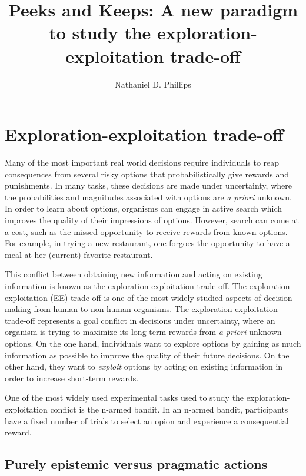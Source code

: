 \documentclass[a4paper,doc,natbib,floatsintext]{apa6}\usepackage[]{graphicx}\usepackage[]{color}
\title{Peeks and Keeps: A new paradigm to study the exploration-exploitation trade-off}
\author{Nathaniel D. Phillips}
\affiliation{University of Konstanz}
\begin{document}


\maketitle

\section{Exploration-exploitation trade-off}

Many of the most important real world decisions require individuals to reap consequences from several risky options that probabilistically give rewards and punishments. In many tasks, these decisions are made under uncertainty, where the probabilities and magnitudes associated with options are \textit{a priori} unknown. In order to learn about options, organisms can engage in active search which improves the quality of their impressions of options. However, search can come at a cost, such as the missed opportunity to receive rewards from known options. For example, in trying a new restaurant, one forgoes the opportunity to have a meal at her (current) favorite restaurant.

This conflict between obtaining new information and acting on existing information is known as the exploration-exploitation trade-off. The exploration-exploitation (EE) trade-off is one of the most widely studied aspects of decision making from human to non-human organisms. The exploration-exploitation trade-off represents a goal conflict in decisions under uncertainty, where an organism is trying to maximize its long term rewards from \textit{a priori} unknown options. On the one hand, individuals want to explore options by gaining as much information as possible to improve the quality of their future decisions. On the other hand, they want to \textit{exploit} options by acting on existing information in order to increase short-term rewards.

One of the most widely used experimental tasks used to study the exploration-exploitation conflict is the n-armed bandit. In an n-armed bandit, participants have a fixed number of trials to select an opion and experience a consequential reward.



\subsection{Purely epistemic versus pragmatic actions}
\end{document}
